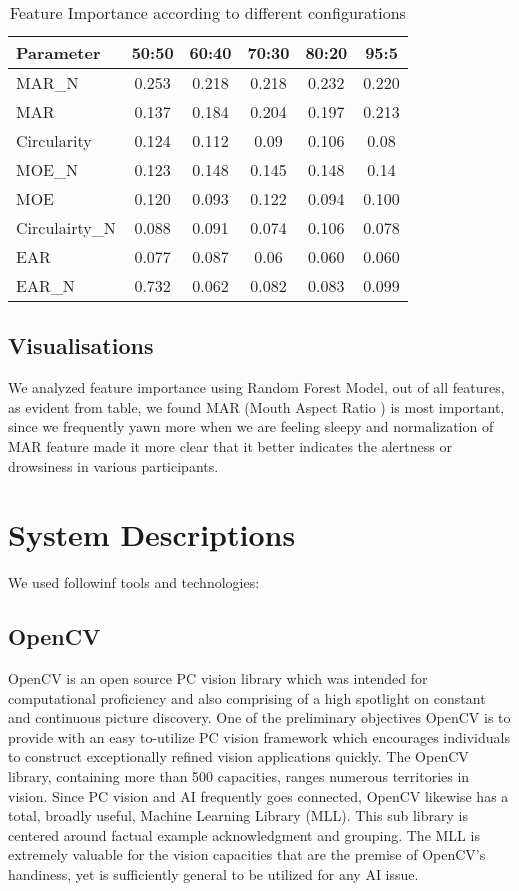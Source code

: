 \documentclass{article}
\begin{document}
\begin{table}[H]
\centering
\begin{tabular}{|l|c|c|c|c|c|}
\hline
\textbf{Parameter} &  \textbf{50:50} &  \textbf{60:40} &  \textbf{70:30} &  \textbf{80:20} &  \textbf{95:5}\\
\hline
MAR\_N & 0.253 & 0.218 & 0.218 & 0.232 & 0.220\\
\hline
MAR & 0.137 & 0.184 & 0.204 & 0.197 & 0.213\\ 
\hline
Circularity & 0.124 & 0.112 & 0.09 & 0.106 & 0.08\\  
\hline
MOE\_N & 0.123 & 0.148 & 0.145 & 0.148 & 0.14 \\         
\hline
MOE & 0.120 & 0.093 & 0.122 & 0.094 & 0.100 \\         
\hline
Circulairty\_N & 0.088 & 0.091 & 0.074 & 0.106 & 0.078 \\ 
\hline
EAR & 0.077 & 0.087 & 0.06 & 0.060 & 0.060 \\ 
\hline
EAR\_N & 0.732 & 0.062 & 0.082 & 0.083 & 0.099 \\
\hline

\end{tabular}
\caption{Feature Importance according to different configurations}

\label{tbl:dataset}
\end{table}


\subsection{Visualisations}

We analyzed feature importance using Random Forest Model, out of all features, as evident from table, we found  MAR (Mouth Aspect Ratio ) is most important, since we frequently yawn more when we are feeling sleepy and normalization of MAR feature  made it more clear that it better indicates the alertness or drowsiness in various participants.
\newpage

\section{System Descriptions}
We used followinf tools and technologies:
\subsection{OpenCV}
OpenCV is an open source PC vision library which was intended for computational proficiency and also comprising of a high spotlight on constant and continuous picture discovery. One of the preliminary objectives OpenCV is to provide with an easy to-utilize PC vision framework which encourages individuals to construct exceptionally refined vision applications quickly. The OpenCV library, containing more than 500 capacities, ranges numerous territories in vision. Since PC vision and AI frequently goes connected, OpenCV likewise has a total, broadly useful, Machine Learning Library (MLL). This sub library is centered around factual example acknowledgment and grouping. The MLL is extremely valuable for the vision capacities that are the premise of OpenCV's handiness, yet is sufficiently general to be utilized for any AI issue.
\end{document}
